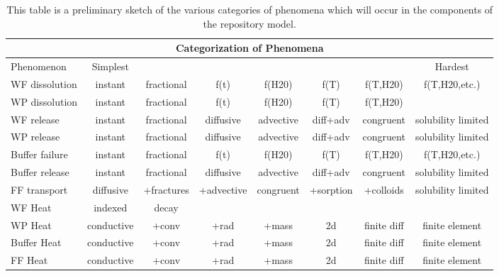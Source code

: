 %
\begin{table}
  \centering
  \footnotesize{
  \begin{tabular}{|l|c|c|c|c|c|c|c|}
    \multicolumn{8}{c}{\textbf{Categorization of Phenomena}}\\
    \hline
     Phenomenon&Simplest&&&&&&Hardest\\
    \hline
     WF dissolution&instant&fractional&f(t)&f(H20)&f(T)&f(T,H20)&f(T,H20,etc.)\\
     WP dissolution&instant&fractional&f(t)&f(H20)&f(T)&f(T,H20)&\\
     WF release&instant&fractional&diffusive&advective&diff+adv&congruent&solubility limited\\
     WP release&instant&fractional&diffusive&advective&diff+adv&congruent&solubility limited\\
     Buffer failure&instant&fractional&f(t)&f(H20)&f(T)&f(T,H20)&f(T,H20,etc.)\\
     Buffer release &instant&fractional&diffusive&advective&diff+adv&congruent&solubility limited\\
     FF transport &diffusive&+fractures&+advective&congruent&+sorption&+colloids&solubility limited\\
     WF Heat&indexed&decay&&&&&\\
     WP Heat&conductive&+conv&+rad&+mass&2d&finite diff&finite element\\
     Buffer Heat&conductive&+conv&+rad&+mass&2d&finite diff&finite element\\
     FF Heat&conductive&+conv&+rad&+mass&2d&finite diff&finite element\\
    \hline
  \end{tabular}
  \caption[Categorization of Phenomena]{This table is a preliminary sketch of 
  the various categories of phenomena which will occur in the components of the  
  repository model.}
  \label{tab:cat}
  }
\end{table}



